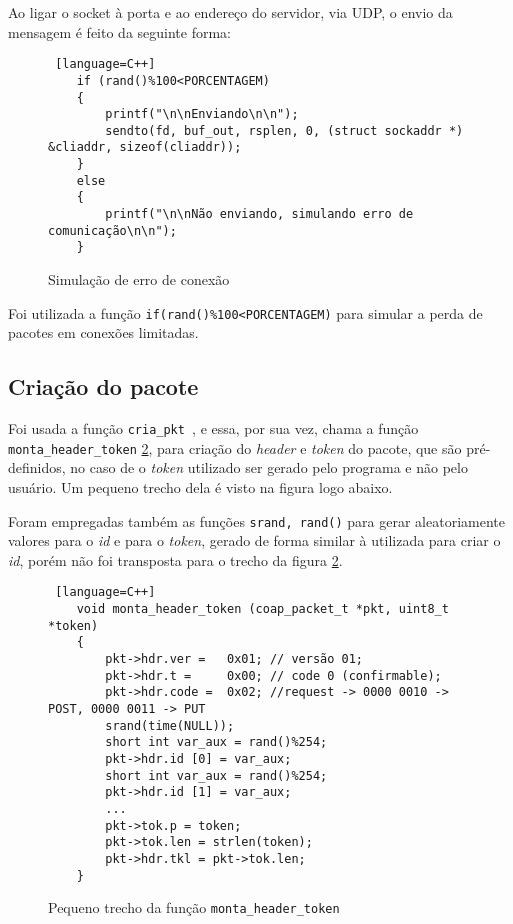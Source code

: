 Ao ligar o socket à porta e ao endereço do servidor, via UDP, o envio da mensagem é feito da seguinte forma: 

\begin{figure}[!htb]
	\begin{lstlisting} [language=C++]
	if (rand()%100<PORCENTAGEM)
	{
		printf("\n\nEnviando\n\n");
		sendto(fd, buf_out, rsplen, 0, (struct sockaddr *) &cliaddr, sizeof(cliaddr));
	}
	else
	{
		printf("\n\nNão enviando, simulando erro de comunicação\n\n");
	}    
	\end{lstlisting}
	\caption{Simulação de erro de conexão}
	\label{code:simulacao_erro_conexao}
\end{figure}

Foi utilizada a função \texttt{if(rand()\%100<PORCENTAGEM)} para simular a perda de pacotes em conexões limitadas.


\subsection{Criação do pacote}

Foi usada a função \texttt{cria\_pkt }, e essa, por sua vez, chama a função  \texttt{monta\_header\_token} \ref{code:monta_header_token}, para criação do \textit{header} e \textit{token} do pacote, que são pré-definidos, no caso de o \textit{token} utilizado ser gerado pelo programa e não pelo usuário. Um pequeno trecho dela é visto na figura logo abaixo.

Foram empregadas também as funções \texttt{srand, rand()} para gerar aleatoriamente valores para o \textit{id} e para o \textit{token}, gerado de forma similar à utilizada para criar o \textit{id}, porém não foi transposta para o trecho da figura \ref{code:monta_header_token}.

\begin{figure}[!htb]
	\begin{lstlisting} [language=C++]
	void monta_header_token (coap_packet_t *pkt, uint8_t *token)
	{
		pkt->hdr.ver = 	 0x01; // versão 01;
		pkt->hdr.t = 	 0x00; // code 0 (confirmable);
		pkt->hdr.code =  0x02; //request -> 0000 0010 -> POST, 0000 0011 -> PUT
		srand(time(NULL));
		short int var_aux = rand()%254;
		pkt->hdr.id [0] = var_aux;
		short int var_aux = rand()%254;
		pkt->hdr.id [1] = var_aux;
		...
		pkt->tok.p = token;
		pkt->tok.len = strlen(token);
		pkt->hdr.tkl = pkt->tok.len;
	}
	\end{lstlisting}
	\caption{Pequeno trecho da função \texttt{monta\_header\_token}}
	\label{code:monta_header_token}
\end{figure} 

